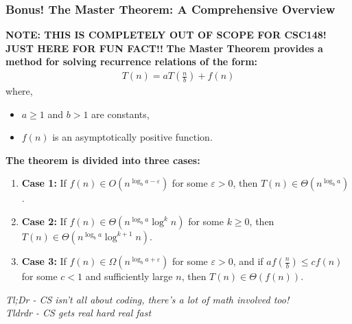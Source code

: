 \documentclass[hyperref={colorlinks,citecolor=blue,linkcolor=blue,urlcolor=blue}, aspectratio=1610]{beamer}
\begin{document}
\begin{frame}
  \frametitle{Bonus! The Master Theorem: A Comprehensive Overview}
  \textbf{NOTE: THIS IS COMPLETELY OUT OF SCOPE FOR CSC148! JUST HERE FOR FUN FACT!!}
  \textbf{The Master Theorem provides a method for solving recurrence relations of the form:}
  \begin{align*}
    T(n) = aT\left(\frac{n}{b}\right) + f(n)
  \end{align*}
  where, 
  \begin{itemize}
    \item $a \geq 1$ and $b > 1$ are constants,
    \item $f(n)$ is an asymptotically positive function.
  \end{itemize}
  
  \textbf{The theorem is divided into three cases:}
  \begin{enumerate}
    \item \textbf{Case 1:} If $f(n) \in O(n^{\log_b a - \varepsilon})$ for some $\varepsilon > 0$, then $T(n) \in \Theta(n^{\log_b a})$.
    \item \textbf{Case 2:} If $f(n) \in \Theta(n^{\log_b a}\log^k n)$ for some $k \geq 0$, then $T(n) \in \Theta(n^{\log_b a}\log^{k+1} n)$.
    \item \textbf{Case 3:} If $f(n) \in \Omega(n^{\log_b a + \varepsilon})$ for some $\varepsilon > 0$, and if $af\left(\frac{n}{b}\right) \leq cf(n)$ for some $c < 1$ and sufficiently large $n$, then $T(n) \in \Theta(f(n))$.
  \end{enumerate}

  \begin{center}
    \textit{Tl;Dr - CS isn't all about coding, there's a lot of math involved too!}\\
    \textit{Tldrdr - CS gets real hard real fast}      
  \end{center}
\end{frame}
\end{document}

